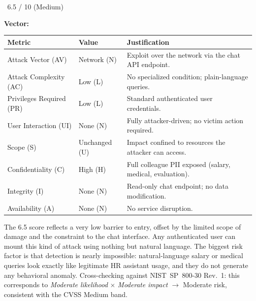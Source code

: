 \begin{cvssbox}{\badgemedium\ 6.5 / 10 (Medium)}
\vspace{2pt}
\begin{center}
\textbf{Vector:}\enspace
{}
\end{center}
\vspace{8pt}
\begin{tabular}{W{3.4cm}W{2.2cm}W{7.8cm}}
\toprule
  
  \small\textbf{Metric} &
  \small\textbf{Value} &
  \small\textbf{Justification} \\
  \midrule
  
  \small Attack Vector (AV)     & \small Network (N) & \small Exploit over the network via the chat API endpoint. \\
  
  \small Attack Complexity (AC) & \small Low (L)     & \small No specialized condition; plain-language queries. \\
  
  \small Privileges Required (PR)  & \small Low (L) & \small Standard authenticated user credentials. \\
  
  \small User Interaction (UI)  & \small None (N)    & \small Fully attacker-driven; no victim action required. \\
  
  \small Scope (S)              & \small Unchanged (U) & \small Impact confined to resources the attacker can access. \\
  
  \small Confidentiality (C)    & \small High (H)    & \small Full colleague PII exposed (salary, medical, evaluation). \\
  
  \small Integrity (I)          & \small None (N)    & \small Read-only chat endpoint; no data modification. \\
  
  \small Availability (A)       & \small None (N)    & \small No service disruption. \\
  \bottomrule
\end{tabular}
\vspace{6pt}

\small The 6.5 score reflects a very low barrier to entry, offset by the
limited scope of damage and the constraint to the chat interface. Any
authenticated user can mount this kind of attack using nothing but natural
language. The biggest risk factor is that detection is nearly
impossible: natural-language salary or medical queries look exactly like
legitimate HR assistant usage, and they do not generate any behavioral
anomaly. Cross-checking against NIST~SP~800-30 Rev.~1: this corresponds
to \emph{Moderate likelihood} $\times$ \emph{Moderate impact}
$\to$ Moderate risk, consistent with the CVSS Medium band.
\end{cvssbox}


